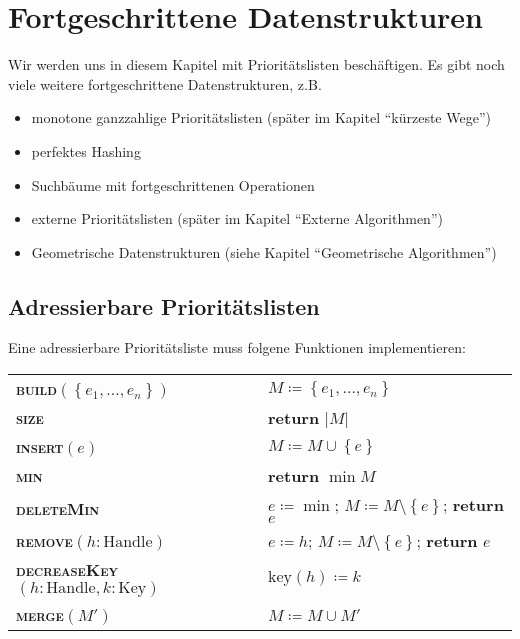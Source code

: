 \chapter{Fortgeschrittene Datenstrukturen}

Wir werden uns in diesem Kapitel mit Prioritätslisten beschäftigen. Es gibt noch viele weitere fortgeschrittene Datenstrukturen, z.B.
\begin{itemize}
  \item monotone ganzzahlige Prioritätslisten (später im Kapitel ``kürzeste Wege'')
  \item perfektes Hashing
  \item Suchbäume mit fortgeschrittenen Operationen
  \item externe Prioritätslisten (später im Kapitel ``Externe Algorithmen'')
  \item Geometrische Datenstrukturen (siehe Kapitel ``Geometrische Algorithmen'')
\end{itemize}

\section{Adressierbare Prioritätslisten}

Eine adressierbare Prioritätsliste muss folgene Funktionen implementieren:

\begin{pseudocode}
  \begin{tabular}{ll}
    \textbf{\textsc{build}}\( (\left \{ e_1,\dots,e_n \right \}) \) & \( M \coloneqq \left \{ e_1,\dots,e_n \right \} \) \\
    \textbf{\textsc{size}} & \textbf{return} \( \left\vert M \right\vert \) \\
    \textbf{\textsc{insert}}\( (e) \) & \( M \coloneqq M \cup \left \{ e \right \} \) \\
    \textbf{\textsc{min}} & \textbf{return} \( \min M \) \\
    \textbf{\textsc{deleteMin}} & \( e \coloneqq \min \); \enskip \( M \coloneqq M \setminus \left \{ e \right \} \); \enskip \textbf{return} \( e \) \\
    \textbf{\textsc{remove}}\( (h : \text{Handle}) \) & \( e \coloneqq h \); \enskip \( M \coloneqq M \setminus \left \{ e \right \} \); \enskip \textbf{return} \( e \) \\
    \textbf{\textsc{decreaseKey}}\( (h : \text{Handle}, k : \text{Key}) \) & \( \text{key}(h) \coloneqq k \) \\
    \textbf{\textsc{merge}}\( (M') \) & \( M \coloneqq M \cup M' \)
  \end{tabular}
\end{pseudocode}

